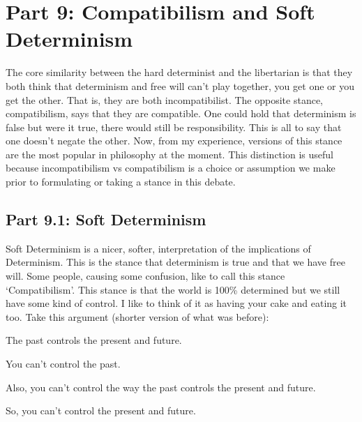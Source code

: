 \chapter{Part 9: Compatibilism and Soft Determinism}
The core similarity between the hard determinist and the libertarian is that they both think that determinism and free will can’t play together, you get one or you get the other. That is, they are both incompatibilist. The opposite stance, compatibilism, says that they are compatible. One could hold that determinism is false but were it true, there would still be responsibility. This is all to say that one doesn't negate the other. Now, from my experience, versions of this stance are the most popular in philosophy at the moment. This distinction is useful because incompatibilism vs compatibilism is a choice or assumption we make prior to formulating or taking a stance in this debate. 

\section{Part 9.1: Soft Determinism}

Soft Determinism is a nicer, softer, interpretation of the implications of Determinism. This is the stance that determinism is true and that we have free will. Some people, causing some confusion, like to call this stance `Compatibilism'. This stance is that the world is 100\% determined but we still have some kind of control. I like to think of it as having your cake and eating it too. Take this argument (shorter version of what was before):

\begin{earg}
    \item[]The past controls the present and future.
    \item[]You can't control the past.
    \item[]Also, you can't control the way the past controls the present and future.
    \item[]So, you can't control the present and future.
\end{earg}

